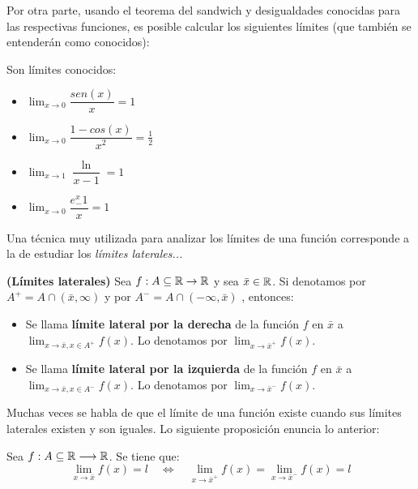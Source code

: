 Por otra parte, usando el teorema del sandwich y desigualdades conocidas para las respectivas funciones, es posible calcular los siguientes límites (que también se entenderán como conocidos): 

\begin{proposicion}
	Son límites conocidos:
	\begin{itemize}
		\item $\lim_{x\rightarrow 0} \dfrac{sen(x)}{x} = 1$
		\item $\lim_{x\rightarrow 0} \dfrac{1 - cos(x)}{x^2} = \frac{1}{2}$ 
		\item $\lim_{x\rightarrow 1} \dfrac{\ln}{x - 1} = 1$ 
		\item $\lim_{x\rightarrow 0} \dfrac{e^x _- 1}{x} = 1$
	\end{itemize}
\end{proposicion}

Una técnica muy utilizada para analizar los límites de una función corresponde a la de estudiar los \textit{límites laterales...}
	

\begin{definicion}
	\textbf{(Límites laterales)}
	Sea $f : A \subseteq \mathbb{R} \rightarrow \mathbb{R}$ y sea $\bar{x}\in \mathbb{R}$. Si denotamos por $A^+ = A \cap (\bar{x}, \infty )$ y por $A^- = A  \cap (- \infty, \bar{x})$ , entonces: 
	\begin{itemize}
		\item Se llama \textbf{límite lateral por la derecha } de la función $f$ en $\bar{x}$ a $\lim_{x\rightarrow\bar{x}, x \in A^+} f(x)$. Lo denotamos por $\lim_{x\rightarrow \bar{x}^+} f(x)$. 
		\item Se llama \textbf{límite lateral por la izquierda } de la función $f$ en $\bar{x}$ a $\lim_{x\rightarrow\bar{x}, x \in A^-} f(x)$. Lo denotamos por $\lim_{x\rightarrow \bar{x}^-} f(x)$. 
	\end{itemize}
\end{definicion}

Muchas veces se habla de que el límite de una función existe cuando sus límites laterales existen y son iguales. Lo siguiente proposición enuncia lo anterior: 

\begin{proposicion}
	Sea $f: A \subseteq \mathbb{R}\longrightarrow \mathbb{R}$. Se tiene que: 
	$$ \lim_{x\rightarrow\bar{x}} f(x) = l \quad \iff \quad \lim_{x\rightarrow \bar{x}^+} f(x) = \lim_{x\rightarrow \bar{x}^-} f(x) = l $$ 
\end{proposicion}		



